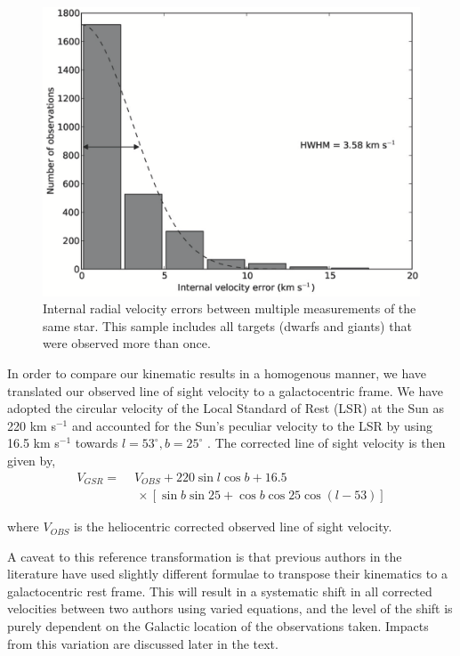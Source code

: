 \documentclass{emulateapj}
\begin{document}
	\begin{figure}[t!]
		\centering
		\includegraphics[width=18.4cm]{./figures/vel_error.eps}
		\caption{Internal radial velocity errors between multiple measurements of the same star. This sample includes all targets (dwarfs and giants) that were observed more than once.}
		\label{fig:multiple-kinematics}
	\end{figure}
	
	In order to compare our kinematic results in a homogenous manner, we have translated our observed line of sight velocity to a galactocentric frame. We have adopted the circular velocity of the Local Standard of Rest (LSR) at the Sun as 220 km s$^{-1}$ \citep{Kerr;Lynden-Bell_1986} and accounted for the Sun's peculiar velocity to the LSR by using 16.5 km s$^{-1}$ towards $l = 53^{\circ}, b= 25^{\circ}$ \citep{Mihalas;Binney_1981}. The corrected line of sight velocity is then given by,
	\begin{align}
		V_{GSR} =  \,&\,V_{OBS} + 220\sin{l}\cos{b} + 16.5  \\
		 			&\,\, \times[\sin{b}\sin{25} + \cos{b}\cos{25}\cos{(l - 53)}] \nonumber
	\end{align}

\noindent where $V_{OBS}$ is the heliocentric corrected observed line of sight velocity.

	A caveat to this reference transformation is that previous authors in the literature have used slightly different formulae to transpose their kinematics to a galactocentric rest frame. This will result in a systematic shift in all corrected velocities between two authors using varied equations, and the level of the shift is purely dependent on the Galactic location of the observations taken. Impacts from this variation are discussed later in the text.
\end{document}
